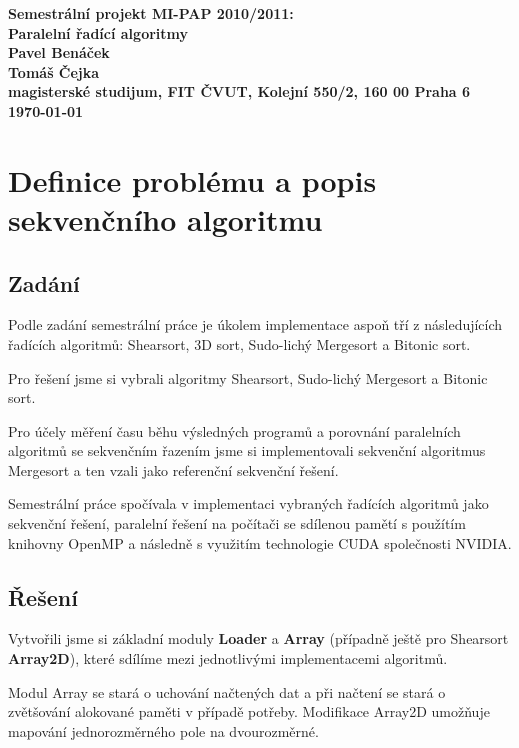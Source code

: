\documentclass[12pt]{article}
\begin{document}

\begin{center}
\bf Semestrální projekt MI-PAP 2010/2011:\\[5mm]
    Paralelní řadící algoritmy\\[5mm]
    Pavel Benáček\\   
    Tomáš Čejka\\[2mm]
magisterské studijum, FIT ČVUT, Kolejní 550/2, 160 00 Praha 6\\[2mm]
\today
\end{center}

\section{Definice problému a popis sekvenčního algoritmu}
\subsection{Zadání}
Podle zadání semestrální práce je úkolem implementace aspoň tří z následujících
řadících algoritmů: Shearsort, 3D sort, Sudo-lichý Mergesort a Bitonic sort.

Pro řešení jsme si vybrali algoritmy Shearsort, Sudo-lichý Mergesort a Bitonic sort.

Pro účely měření času běhu výsledných programů a porovnání paralelních algoritmů se sekvenčním
řazením jsme si implementovali sekvenční algoritmus Mergesort a ten vzali jako referenční sekvenční
řešení.

Semestrální práce spočívala v implementaci vybraných řadících algoritmů jako sekvenční řešení, paralelní
řešení na počítači se sdílenou pamětí s použítím knihovny OpenMP a následně s využitím technologie CUDA
společnosti NVIDIA\textsuperscript{\tiny{\textregistered}}.

\subsection{Řešení}
Vytvořili jsme si základní moduly \textbf{Loader} a \textbf{Array} (případně ještě pro Shearsort 
\textbf{Array2D}), které sdílíme mezi jednotlivými implementacemi algoritmů.

Modul Array se stará o uchování načtených dat a při načtení se stará o zvětšování alokované paměti 
v případě potřeby. Modifikace Array2D umožňuje mapování jednorozměrného pole na dvourozměrné.
\end{document}
